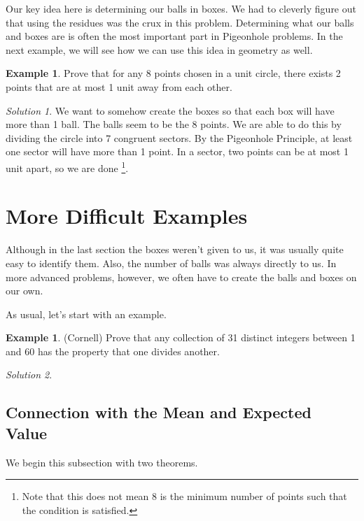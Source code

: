 \documentclass[l1pt]{article}
\theoremstyle{plain}
\theoremstyle{definition}
\newtheorem{example}[thm]{Example}
\theoremstyle{remark}
\newtheorem*{solution}{Solution}
\begin{document}
\bigskip

Our key idea here is determining our balls in boxes. We had to cleverly figure out that using the residues was the crux in this problem. Determining what our balls and boxes are is often the most important part in Pigeonhole problems. In the next example, we will see how we can use this idea in geometry as well.

\begin{example}
Prove that for any 8 points chosen in a unit circle, there exists 2 points that are at most 1 unit away from each other.
\end{example}

\begin{solution}
We want to somehow create the boxes so that each box will have more than 1 ball. The balls seem to be the 8 points. We are able to do this by dividing the circle into 7 congruent sectors. By the Pigeonhole Principle, at least one sector will have more than 1 point. In a sector, two points can be at most 1 unit apart, so we are done \footnote{Note that this does not mean 8 is the minimum number of points such that the condition is satisfied.}.
\end{solution}

\section{More Difficult Examples}

Although in the last section the boxes weren't given to us, it was usually quite easy to identify them. Also, the number of balls was always directly to us. In more advanced problems, however, we often have to create the balls and boxes on our own. 

As usual, let's start with an example.

\begin{example}
(Cornell) Prove that any collection of 31 distinct integers between 1 and 60 has the property that one divides another.
\end{example}

\begin{solution}

\end{solution}

\subsection{Connection with the Mean and Expected Value}
We begin this subsection with two theorems.
\end{document}

